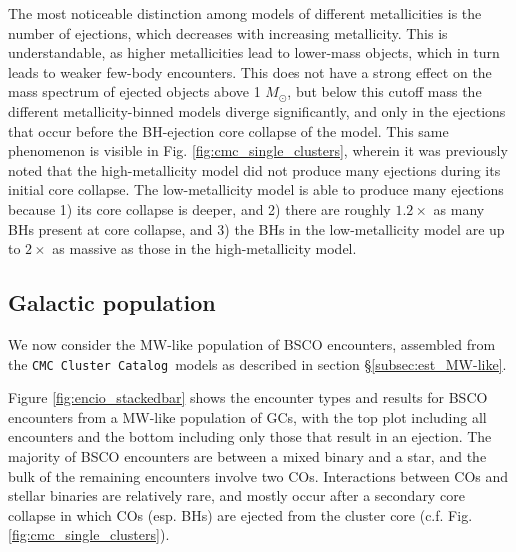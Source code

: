 \documentclass[twocolumn]{aastex631}
\newcommand{\CMCcat}{\texttt{CMC Cluster Catalog}}
\begin{document}
The most noticeable distinction among models of different metallicities is the number of ejections, which decreases with increasing metallicity.
This is understandable, as higher metallicities lead to lower-mass objects, which in turn leads to weaker few-body encounters.
This does not have a strong effect on the mass spectrum of ejected objects above 1 $M_\odot$, but below this cutoff mass the different metallicity-binned models diverge significantly, and only in the ejections that occur before the BH-ejection core collapse of the model.
This same phenomenon is visible in Fig. \ref{fig:cmc_single_clusters}, wherein it was previously noted that the high-metallicity model did not produce many ejections during its initial core collapse.
The low-metallicity model is able to produce many ejections because 1) its core collapse is deeper, and 2) there are roughly $1.2 \times$ as many BHs present at core collapse, and 3) the BHs in the low-metallicity model are up to $2 \times$ as massive as those in the high-metallicity model.

\subsection{Galactic population} \label{subsec:res_MW-like}

We now consider the MW-like population of BSCO encounters, assembled from the \CMCcat\ models as described in section \S\ref{subsec:est_MW-like}.

Figure \ref{fig:encio_stackedbar} shows the encounter types and results for BSCO encounters from a MW-like population of GCs, with the top plot including all encounters and the bottom including only those that result in an ejection.
The majority of BSCO encounters are between a mixed binary and a star, and the bulk of the remaining encounters involve two COs.
Interactions between COs and stellar binaries are relatively rare, and mostly occur after a secondary core collapse in which COs (esp. BHs) are ejected from the cluster core (c.f. Fig. \ref{fig:cmc_single_clusters}).

\end{document}
